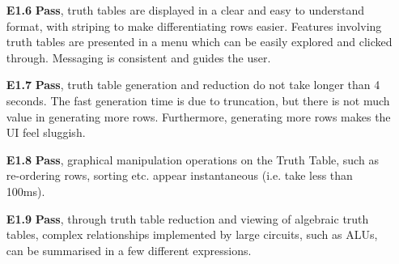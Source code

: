 \begin{itemize}
    \medskip
    \item[\textbf{\textbf{E1.6}}] \textbf{Pass}, truth tables are displayed in a clear and easy to understand format, with striping to make differentiating rows easier. Features involving truth tables are presented in a menu which can be easily explored and clicked through. Messaging is consistent and guides the user.
    \item[\textbf{\textbf{E1.7}}] \textbf{Pass}, truth table generation and reduction do not take longer than 4 seconds. The fast generation time is due to truncation, but there is not much value in generating more rows. Furthermore, generating more rows makes the UI feel sluggish.
    \item[\textbf{\textbf{E1.8}}] \textbf{Pass}, graphical manipulation operations on the Truth Table, such as re-ordering rows, sorting etc. appear instantaneous (i.e. take less than 100ms).
    \item[\textbf{E1.9}] \textbf{Pass}, through truth table reduction and viewing of algebraic truth tables, complex relationships implemented by large circuits, such as ALUs, can be summarised in a few different expressions.
\end{itemize}

